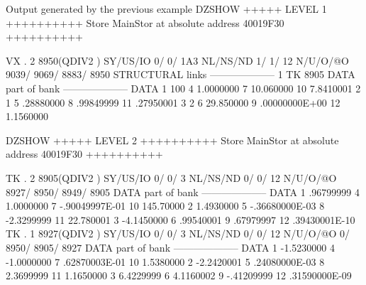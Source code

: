 \begin{landscapebody}
\begin{XMPt}{Output generated by the previous example}
DZSHOW  +++++ LEVEL     1 ++++++++++            Store  MainStor at absolute address 40019F30      ++++++++++                     
                                                                                                                                 
 VX  .     2     8950(QDIV2   ) SY/US/IO    0/    0/ 1A3 NL/NS/ND    1/    1/      12 N/U/O/@O    9039/    9069/    8883/    8950
STRUCTURAL links                                          --------------------                                                   
          1    TK        8905                                                                                                    
DATA part of bank                                         --------------------                                                   
DATA      1               100     4     1.0000000         7     10.060000        10     7.8410001                                
          2                 1     5     .28880000         8     .99849999        11     .27950001                                
          3                 2     6     29.850000         9     .00000000E+00    12     1.1560000                                
                                                                                                                                 
DZSHOW  +++++ LEVEL     2 ++++++++++            Store  MainStor at absolute address 40019F30      ++++++++++                     
                                                                                                                                 
 TK  .     2     8905(QDIV2   ) SY/US/IO    0/    0/   3 NL/NS/ND    0/    0/      12 N/U/O/@O    8927/    8950/    8949/    8905
DATA part of bank                                         --------------------                                                   
DATA      1     .96799999         4     1.0000000         7    -.90049997E-01    10     145.70000                                
          2     1.4930000         5    -.36680000E-03     8    -2.3299999        11     22.780001                                
          3    -4.1450000         6     .99540001         9     .67979997        12     .39430001E-10                            
 TK  .     1     8927(QDIV2   ) SY/US/IO    0/    0/   3 NL/NS/ND    0/    0/      12 N/U/O/@O       0/    8950/    8905/    8927
DATA part of bank                                         --------------------                                                   
DATA      1    -1.5230000         4    -1.0000000         7     .62870003E-01    10     1.5380000                                
          2    -2.2420001         5     .24080000E-03     8     2.3699999        11     1.1650000                                
          3     6.4229999         6     4.1160002         9    -.41209999        12     .31590000E-09                            
                                                                                                                                 

\end{XMPt}
\end{landscapebody}
